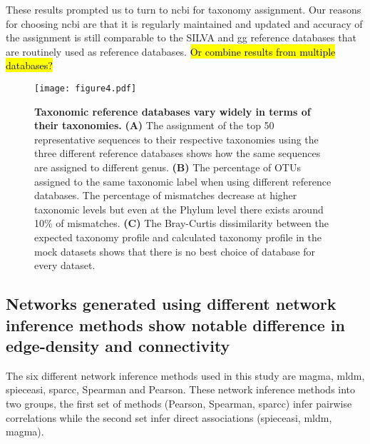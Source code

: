   These results prompted us to turn to \ac{ncbi} for taxonomy assignment.
  Our reasons for choosing \ac{ncbi} are that it is regularly maintained and updated and accuracy of the assignment is still comparable to the SILVA and \ac{gg} reference databases that are routinely used as reference databases.
  \hl{Or combine results from multiple databases?}

  \begin{figure}[h]
    \centering
    \texttt{[image: figure4.pdf]}
    \caption{
      \textbf{Taxonomic reference databases vary widely in terms of their taxonomies.}
      \textbf{(A)} The assignment of the top 50 representative sequences to their respective taxonomies using the three different reference databases shows how the same sequences are assigned to different genus.
      \textbf{(B)} The percentage of \ac{OTU}s assigned to the same taxonomic label when using different reference databases.
      The percentage of mismatches decrease at higher taxonomic levels but even at the Phylum level there exists around 10\% of mismatches.
      \textbf{(C)} The Bray-Curtis dissimilarity between the expected taxonomy profile and calculated taxonomy profile in the mock datasets shows that there is no best choice of database for every dataset.
    }
    \label{fig:figure4}
  \end{figure}

  \FloatBarrier

  \subsection*{Networks generated using different network inference methods show notable difference in edge-density and connectivity}

  The six different network inference methods used in this study are \ac{magma}, \ac{mldm}, \ac{spieceasi}, \ac{sparcc}, Spearman and Pearson.
  These network inference methods into two groups, the first set of methods (Pearson, Spearman, \ac{sparcc}) infer pairwise correlations while the second set infer direct associations (\ac{spieceasi}, \ac{mldm}, \ac{magma}).

